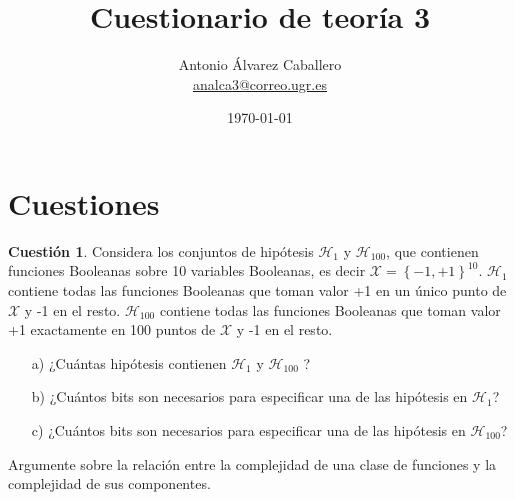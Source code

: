 \documentclass[a4paper, 11pt]{article}
\title{Cuestionario de teoría 3}
\author{Antonio Álvarez Caballero\\
    \href{mailto:analca3@correo.ugr.es}{analca3@correo.ugr.es}}
\date{\today}
\theoremstyle{definition}
\newtheorem{cuestion}{Cuestión}
\begin{document}
  \maketitle

  \section{Cuestiones}

  \begin{cuestion}
    Considera los conjuntos de hipótesis $\mathcal{H}_1$ y $\mathcal{H}_{100}$, que contienen funciones Booleanas sobre 10 variables Booleanas, es decir $\mathcal{X} = \left\{-1,+1 \right\}^{10}$. $\mathcal{H}_1$ contiene todas las funciones Booleanas que toman valor +1 en un único punto de $\mathcal{X}$ y -1 en el resto. $\mathcal{H}_{100}$ contiene todas las funciones Booleanas que toman valor +1 exactamente en 100 puntos de $\mathcal{X}$ y -1 en el resto.

    \begin{enumerate}
      \item[a)] ¿Cuántas hipótesis contienen $\mathcal{H}_1$ y $\mathcal{H}_{100}$ ?
      \item[b)] ¿Cuántos bits son necesarios para especificar una de las hipótesis en $\mathcal{H}_1$?
      \item[c)] ¿Cuántos bits son necesarios para especificar una de las hipótesis en $\mathcal{H}_{100}$?
    \end{enumerate}

    Argumente sobre la relación entre la complejidad de una clase de funciones y la complejidad de sus componentes.
  \end{cuestion}
\end{document}
